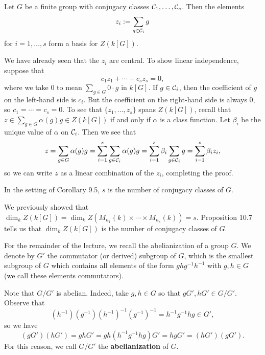 \begin{prop}{}
    Let $G$ be a finite group with conjugacy classes ${\cal C}_1, 
    \dots, {\cal C}_s$. Then the elements 
    \[ z_i := \sum_{g \in {\cal C}_i} g \] 
    for $i = 1, \dots, s$ form a basis for $Z(k[G])$. 
\end{prop} 
\begin{pf}
    We have already seen that the $z_i$ are central. To show 
    linear independence, suppose that 
    \[ c_1 z_1 + \cdots + c_s z_s = 0, \] 
    where we take $0$ to mean $\sum_{g \in G} 0 \cdot g$ in $k[G]$. 
    If $g \in {\cal C}_i$, then the coefficient of $g$ on the left-hand 
    side is $c_i$. But the coefficient on the right-hand side is 
    always $0$, so $c_1 = \cdots = c_s = 0$. To see that 
    $\{z_1, \dots, z_s\}$ spans $Z(k[G])$, recall that 
    $z \in \sum_{g \in G} \alpha(g)g \in Z(k[G])$ if and only if 
    $\alpha$ is a class function. Let $\beta_i$ be the unique value 
    of $\alpha$ on ${\cal C}_i$. Then we see that 
    \[ z = \sum_{g \in G} \alpha(g)g = \sum_{i=1}^s \sum_{g \in {\cal C}_i} 
    \alpha(g)g = \sum_{i=1}^s \beta_i \sum_{g \in {\cal C}_i} g 
    = \sum_{i=1}^s \beta_i z_i, \] 
    so we can write $z$ as a linear combination of the $z_i$, completing the 
    proof. 
\end{pf}

\begin{theo}{}
    In the setting of Corollary 9.5, $s$ is the number of conjugacy 
    classes of $G$. 
\end{theo} 
\begin{pf}
    We previously showed that $\dim_k Z(k[G]) = \dim_k Z(M_{n_1}(k) \times 
    \cdots \times M_{n_s}(k)) = s$. Proposition 10.7 tells us that 
    $\dim_k Z(k[G])$ is the number of conjugacy classes of $G$. 
\end{pf} 

For the remainder of the lecture, we recall the abelianization of a group $G$.
We denote by $G'$ the commutator (or derived) subgroup of $G$, which is the 
smallest subgroup of $G$ which contains all elements of the form 
$ghg^{-1}h^{-1}$ with $g, h \in G$ (we call these elements commutators). 

Note that $G/G'$ is abelian. Indeed, take $g, h \in G$ so that 
$gG', hG' \in G/G'$. Observe that 
\[ (h^{-1})(g^{-1})(h^{-1})^{-1}(g^{-1})^{-1} = 
    h^{-1}g^{-1}hg \in G', \] 
so we have 
\[ (gG')(hG') = ghG' = gh(h^{-1}g^{-1}hg)G' = hgG' = (hG')(gG'). \]
For this reason, we call $G/G'$ the {\bf abelianization} of $G$. 

